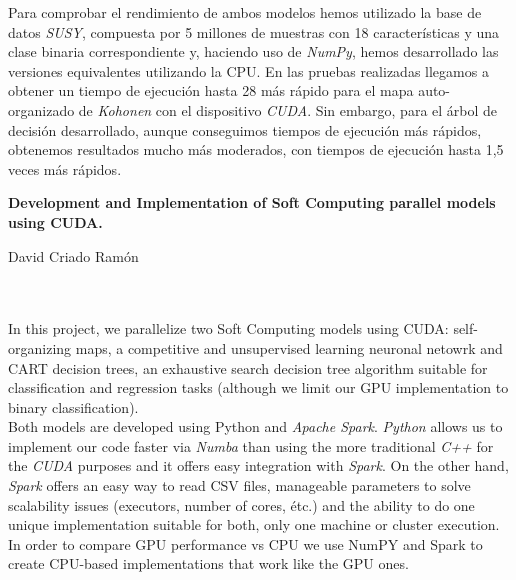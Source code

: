 Para comprobar el rendimiento de ambos modelos hemos utilizado la base de datos \textit{SUSY}, compuesta por 5 millones de muestras con 18 características y una clase binaria correspondiente y, haciendo uso de \textit{NumPy}, hemos desarrollado las versiones equivalentes utilizando la CPU. En las pruebas realizadas llegamos a obtener un tiempo de ejecución hasta 28 más rápido para el mapa auto-organizado de \textit{Kohonen} con el dispositivo \textit{CUDA}. Sin embargo, para el árbol de decisión desarrollado, aunque conseguimos tiempos de ejecución más rápidos, obtenemos resultados mucho más moderados, con tiempos de ejecución hasta 1,5 veces más rápidos.


\thispagestyle{empty}


\begin{center}
{\large\bfseries Development and Implementation of Soft Computing parallel models using CUDA.}\\
\end{center}
\begin{center}
David Criado Ramón\\
\end{center}

\\

\vspace{0.7cm}
\\

In this project, we parallelize two Soft Computing models using CUDA: self-organizing maps, a competitive and unsupervised learning neuronal netowrk and CART decision trees, an exhaustive search decision tree algorithm suitable for classification and regression tasks (although we limit our GPU implementation to binary classification).\\

Both models are developed using Python and \textit{Apache Spark}. \textit{Python} allows us to implement our code faster via \textit{Numba} than using the more traditional \textit{C++} for the \textit{CUDA} purposes and it offers easy integration with \textit{Spark}. On the other hand, \textit{Spark} offers an easy way to read CSV files, manageable parameters to solve scalability issues (executors, number of cores, étc.) and the ability to do one unique implementation suitable for both, only one machine or cluster execution. In order to compare GPU performance vs CPU we use NumPY and Spark to create CPU-based implementations that work like the GPU ones.\\

